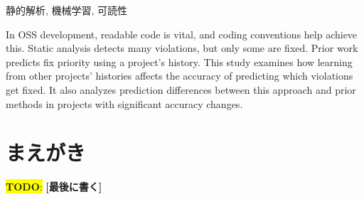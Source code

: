 \documentclass[paper]{ieicej}
\newcommand{\todo}[1]{\colorbox{yellow}{{\bf TODO}:}{\color{red} {\textbf{[#1]}}}}
\begin{document}
\begin{abstract}
\todo{最後に書く}
OSS開発では，可読性の高いソースコードが重要であり，コーディング規約はそのための手段となる．しかし，規約違反コードは大量に検出されるため，修正は一部に留まることが多い．従来研究では，プロジェクト自身の修正履歴に基づき違反箇所の修正優先度を予測してきた．本研究では，他の複数プロジェクトの開発履歴を学習させることによる予測精度の変化を検証し，予測精度が大きく異なるプロジェクトにおける予測結果の差異を詳細に分析する．
\end{abstract}
\begin{keyword}
静的解析, 機械学習, 可読性
\end{keyword}
\begin{eabstract}
In OSS development, readable code is vital, and coding conventions help achieve this. Static analysis detects many violations, but only some are fixed. Prior work predicts fix priority using a project's history. This study examines how learning from other projects' histories affects the accuracy of predicting which violations get fixed. It also analyzes prediction differences between this approach and prior methods in projects with significant accuracy changes.
\end{eabstract}
\begin{ekeyword}
\end{ekeyword}
\maketitle

\section{まえがき}
\todo{最後に書く}

\end{document}
